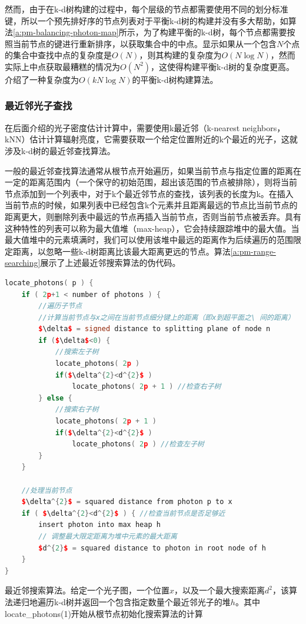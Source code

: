 然而，由于在k-d树构建的过程中，每个层级的节点都需要使用不同的划分标准键，所以一个预先排好序的节点列表对于平衡k-d树的构建并没有多大帮助，如算法\ref{a:pm-balancing-photon-map}所示，为了构建平衡的k-d树，每个节点都需要按照当前节点的键进行重新排序，以获取集合中的中点。\cite{a:MultidimensionalBinarySearchTreesUsedforAssociativeSearching}显示如果从一个包含$N$个点的集合中查找中点的复杂度是$O(N)$，则其构建的复杂度为$O(N\log N)$，然而实际上中点获取最糟糕的情况为$O(N^2)$，这使得构建平衡k-d树的复杂度更高。\cite{a:BuildingaBalancedkdTreeinOknlognTime}介绍了一种复杂度为$O(kN\log N)$的平衡k-d树构建算法。





\subsubsection{最近邻光子查找}
在后面介绍的光子密度估计计算中，需要使用k最近邻（k-nearest neighbors，kNN）估计计算辐射亮度，它需要获取一个给定位置附近的k个最近的光子，这就涉及k-d树的最近邻查找算法。

一般的最近邻查找算法通常从根节点开始遍历，如果当前节点与指定位置的距离在一定的距离范围内（一个保守的初始范围，超出该范围的节点被排除），则将当前节点添加到一个列表中，对于k个最近邻节点的查找，该列表的长度为k。在插入当前节点的时候，如果列表中已经包含k个元素并且距离最远的节点比当前节点的距离更大，则删除列表中最远的节点再插入当前节点，否则当前节点被丢弃。具有这种特性的列表可以称为最大值堆（max-heap），它会持续跟踪堆中的最大值。当最大值堆中的元素填满时，我们可以使用该堆中最远的距离作为后续遍历的范围限定距离，以忽略一些k-d树距离比该最大距离更远的节点。算法\ref{a:pm-range-searching}\cite{a:APracticalGuidetoGlobalIlluminationusingPhotonMaps}展示了上述最近邻搜索算法的伪代码。

\begin{algorithm}
\begin{lstlisting}[language=C++, mathescape]
locate_photons( p ) {
	if ( 2p+1 < number of photons ) { 
		//遍历子节点
		//计算当前节点与x之间在当前节点细分键上的距离（即x到超平面之\ 间的距离）
		$\delta$ = signed distance to splitting plane of node n 
		if ($\delta$<0) {
			//搜索左子树
			locate_photons( 2p ) 
			if($\delta^{2}<d^{2}$ )
				locate_photons( 2p + 1 ) //检查右子树 
		} else {
			//搜索右子树
			locate_photons( 2p + 1 ) 
			if($\delta^{2}<d^{2}$ )
				locate_photons( 2p ) //检查左子树
		}
	}
			
	//处理当前节点
	$\delta^{2}$ = squared distance from photon p to x
	if ( $\delta^{2}<d^{2}$ ) { //检查当前节点是否足够近
		insert photon into max heap h
		// 调整最大限定距离为堆中元素的最大距离
		$d^{2}$ = squared distance to photon in root node of h 
	}
}
\end{lstlisting}
\caption{最近邻搜索算法。给定一个光子图，一个位置$x$，以及一个最大搜索距离$d^{2}$，该算法递归地遍历k-d树并返回一个包含指定数量个最近邻光子的堆$h$。其中locate\_photons(1)开始从根节点初始化搜索算法的计算}
\label{a:pm-range-searching}
\end{algorithm}

